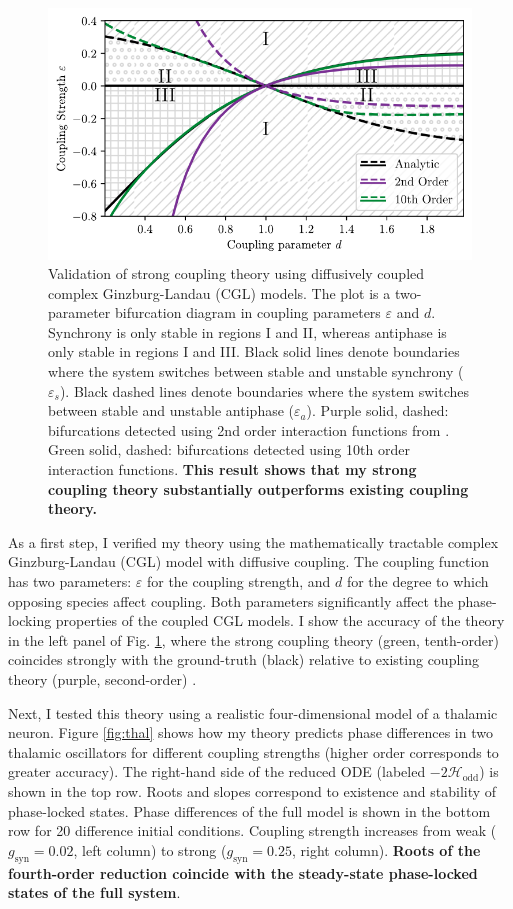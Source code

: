 \documentclass[a4paper,11pt]{article}
\newcommand{\ve}{\varepsilon}
\newcommand{\h}{\mathcal{H}}
\begin{document}
\begin{figure}[ht!]
	\centering
	\includegraphics[width=.75\textwidth]{figures/cgl_2par_edited.pdf}
	\caption{Validation of strong coupling theory using diffusively coupled complex Ginzburg-Landau (CGL) models. The plot is a two-parameter bifurcation diagram in coupling parameters $\ve$ and $d$. Synchrony is only stable in regions I and II, whereas antiphase is only stable in regions I and III. Black solid lines denote boundaries where the system switches between stable and unstable synchrony ($\ve_s$). Black dashed lines denote boundaries where the system switches between stable and unstable antiphase ($\ve_a$). Purple solid, dashed: bifurcations detected using 2nd order interaction functions from \cite{wilson2019phase}. Green solid, dashed: bifurcations detected using 10th order interaction functions. \textbf{This result shows that my strong coupling theory substantially outperforms existing coupling theory.}}\label{fig:cgl}
\end{figure}

As a first step, I verified my theory using the mathematically tractable complex Ginzburg-Landau (CGL) model with diffusive coupling. The coupling function has two parameters: $\ve$ for the coupling strength, and $d$ for the degree to which opposing species affect coupling. Both parameters significantly affect the phase-locking properties of the coupled CGL models. I show the accuracy of the theory in the left panel of Fig. \ref{fig:cgl}, where the strong coupling theory (green, tenth-order) coincides strongly with the ground-truth (black) relative to existing coupling theory (purple, second-order) \cite{wilson2019phase}. 

Next, I tested this theory using a realistic four-dimensional model of a thalamic neuron. Figure \ref{fig:thal} shows how my theory predicts phase differences in two thalamic oscillators for different coupling strengths (higher order corresponds to greater accuracy). The right-hand side of the reduced ODE (labeled $-2\h_{\text{odd}}$) is shown in the top row. Roots and slopes correspond to existence and stability of phase-locked states. Phase differences of the full model is shown in the bottom row for 20 difference initial conditions. Coupling strength increases from weak ($g_\text{syn}=0.02$, left column) to strong ($g_\text{syn}=0.25$, right column). \textbf{Roots of the fourth-order reduction coincide with the steady-state phase-locked states of the full system}.
\end{document}
